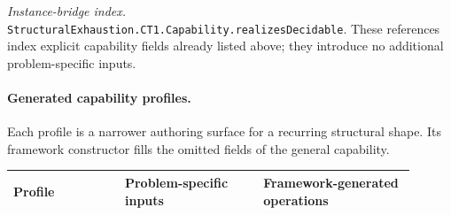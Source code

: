 \emph{Instance-bridge index.} \texttt{Structural\allowbreak{}Exhaustion.\allowbreak{}CT1.\allowbreak{}Capability.\allowbreak{}realizes\allowbreak{}Decidable}. These references index explicit capability fields already listed above; they introduce no additional problem-specific inputs.

\paragraph{Generated capability profiles.}
Each profile is a narrower authoring surface for a recurring structural shape. Its framework constructor fills the omitted fields of the general capability.
\begingroup\small
\begin{longtable}{@{}p{0.25\linewidth}p{0.31\linewidth}p{0.34\linewidth}@{}}
\toprule
Profile & Problem-specific inputs & Framework-generated operations \\
\midrule
\endhead

\end{longtable}
